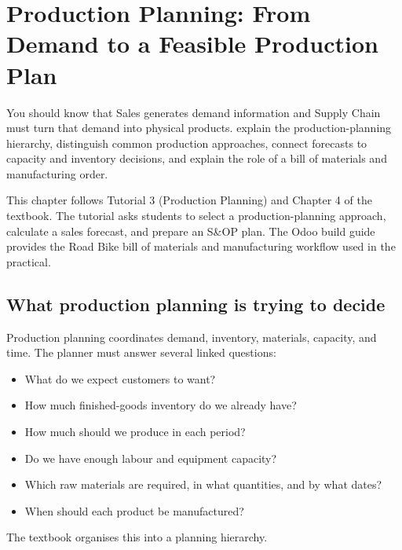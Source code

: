 \chapter{Production Planning: From Demand to a Feasible Production Plan}
\label{ch:production-planning}

\chapterguide
  {You should know that Sales generates demand information and Supply Chain must turn that demand into physical products.}
  {explain the production-planning hierarchy, distinguish common production approaches, connect forecasts to capacity and inventory decisions, and explain the role of a bill of materials and manufacturing order.}

\begin{sourcebasis}
This chapter follows Tutorial 3 (Production Planning) and Chapter 4 of the textbook. The tutorial asks students to select a production-planning approach, calculate a sales forecast, and prepare an S\&OP plan. The Odoo build guide provides the Road Bike bill of materials and manufacturing workflow used in the practical.
\end{sourcebasis}

\section{What production planning is trying to decide}

Production planning coordinates demand, inventory, materials, capacity, and time. The planner must answer several linked questions:

\begin{itemize}
  \item What do we expect customers to want?
  \item How much finished-goods inventory do we already have?
  \item How much should we produce in each period?
  \item Do we have enough labour and equipment capacity?
  \item Which raw materials are required, in what quantities, and by what dates?
  \item When should each product be manufactured?
\end{itemize}

The textbook organises this into a planning hierarchy.

